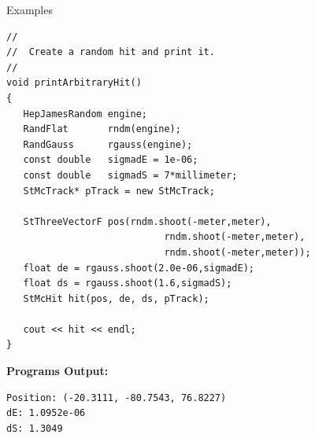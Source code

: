 \begin{Entry}
\item[Examples]
{\footnotesize
\begin{verbatim}
//
//  Create a random hit and print it.
//
void printArbitraryHit()
{
   HepJamesRandom engine;
   RandFlat       rndm(engine);
   RandGauss      rgauss(engine);
   const double   sigmadE = 1e-06;
   const double   sigmadS = 7*millimeter;
   StMcTrack* pTrack = new StMcTrack;

   StThreeVectorF pos(rndm.shoot(-meter,meter),
                            rndm.shoot(-meter,meter),
                            rndm.shoot(-meter,meter));
   float de = rgauss.shoot(2.0e-06,sigmadE);
   float ds = rgauss.shoot(1.6,sigmadS);
   StMcHit hit(pos, de, ds, pTrack);

   cout << hit << endl;
}
\end{verbatim}
}%
{\bf Programs Output:}
{\footnotesize
\begin{verbatim}
Position: (-20.3111, -80.7543, 76.8227)
dE: 1.0952e-06
dS: 1.3049
\end{verbatim}
}%

\end{Entry}
\clearpage
%
%
